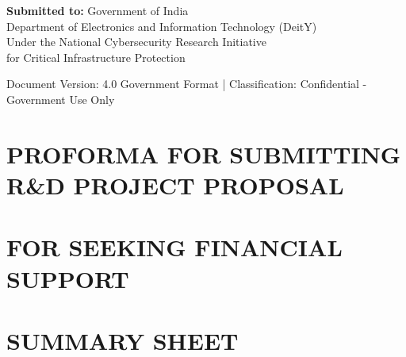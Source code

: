 \documentclass[12pt,a4paper]{article}
\begin{document}
\begin{titlepage}
    \vfill
    
    {\large\textbf{Submitted to:} Government of India\\[0.2cm]}
    {\normalsize Department of Electronics and Information Technology (DeitY)\\[0.2cm]}
    {\normalsize Under the National Cybersecurity Research Initiative\\[0.2cm]}
    {\normalsize for Critical Infrastructure Protection}
    
    \vspace{1cm}
    
    {\footnotesize Document Version: 4.0 Government Format | Classification: Confidential - Government Use Only}
    
\end{titlepage}

\newpage

\section*{PROFORMA FOR SUBMITTING R\&D PROJECT PROPOSAL}
\section*{FOR SEEKING FINANCIAL SUPPORT}
\section*{SUMMARY SHEET}
\end{document}

